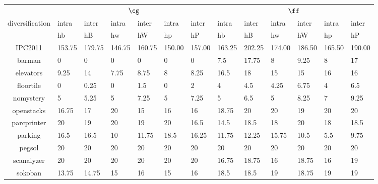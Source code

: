 \begin{table*}[htbp]
\centering
\begin{tabularx}{\linewidth}{|c|X|X|X|X|X|X||X|X|X|X|X|X|}
 & \multicolumn{ 6}{c||}{$\cg$} & \multicolumn{ 6}{c|}{$\ff$} \\ 
diversification & intra  & inter  & intra  & inter  & intra  & inter  & intra  & inter  & intra  & inter  & intra  & inter  \\
                & {hb}   & {hB}   & {hw}   & {hW}   & {hp}   & {hP}   & {hb}   & {hB}   & {hw}   & {hW}   & {hp}   & {hP}   \\[0.3em]
IPC2011         & 153.75 & 179.75 & 146.75 & 160.75 & 150.00 & 157.00 & 163.25 & 202.25 & 174.00 & 186.50 & 165.50 & 190.00 \\[0.3em]
barman          & 0      & 0      & 0      & 0      & 0      & 0      & 7.5    & 17.75  & 8      & 9.25   & 8      & 17     \\ 
elevators       & 9.25   & 14     & 7.75   & 8.75   & 8      & 8.25   & 16.5   & 18     & 15     & 15     & 16     & 16     \\ 
floortile       & 0      & 0.25   & 0      & 1.5    & 0      & 2      & 4      & 4.5    & 4.25   & 6.75   & 4      & 6.5    \\ 
nomystery       & 5      & 5.25   & 5      & 7.25   & 5      & 7.25   & 5      & 6.5    & 5      & 8.25   & 7      & 9.25   \\ 
openstacks      & 16.75  & 17     & 20     & 15     & 16     & 16     & 18.75  & 20     & 20     & 19     & 20     & 20     \\ 
parcprinter     & 20     & 19     & 20     & 19     & 20     & 16.5   & 14.5   & 18.5   & 18     & 20     & 18     & 18.5   \\ 
parking         & 16.5   & 16.5   & 10     & 11.75  & 18.5   & 16.25  & 11.75  & 12.25  & 15.75  & 10.5   & 5.5    & 9.75   \\ 
pegsol          & 20     & 20     & 20     & 20     & 20     & 20     & 20     & 20     & 20     & 20     & 20     & 20     \\ 
scanalyzer      & 20     & 20     & 20     & 20     & 20     & 20     & 16.75  & 18.75  & 16     & 18.75  & 16     & 19     \\ 
sokoban         & 13.75  & 14.75  & 15     & 16     & 15     & 16     & 18.5   & 18.5   & 19     & 18.75  & 19     & 19     \\ 

\end{tabularx}
\end{table*}
